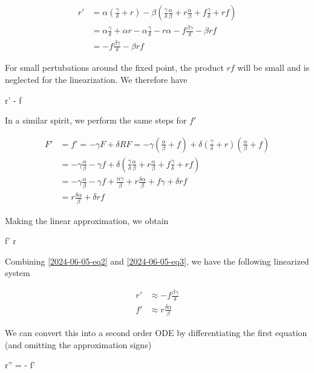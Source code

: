 \begin{align*}
    r' &= \alpha \left(\frac{\gamma}{\delta} + r \right)- \beta \left(\frac{\gamma}{\delta} \frac{\alpha}{\beta} + r \frac{\alpha}{\beta} + f \frac{\gamma}{\delta} + rf\right)\\
    &= \alpha \frac{\gamma}{\delta} + \alpha r  - \alpha \frac{\gamma}{\delta}  - r \alpha - f \frac{\beta \gamma}{\delta} - \beta rf \\
    &= - f \frac{\beta \gamma}{\delta} - \beta rf 
\end{align*}

For small pertubations around the fixed point, the product $rf$ will be small and is neglected for the linearization. We therefore have

\be\label{2024-06-05-eq2}
r' \approx - f \frac{\beta \gamma}{\delta}
\ee

In a similar spirit, we perform the same steps for $f'$

\begin{align*}
    F' &= f' = -\gamma F + \delta RF = -\gamma \left( \frac{\alpha}{\beta} + f \right) + \delta \left( \frac{\gamma}{\delta} + r\right) \left( \frac{\alpha}{\beta} + f\right) \\
    &= -\gamma \frac{\alpha}{\beta} - \gamma f + \delta \left( \frac{\gamma}{\delta} \frac{\alpha}{\beta} + r \frac{\alpha}{\beta} + f \frac{\gamma}{\delta} + rf \right) \\
    &= -\gamma \frac{\alpha}{\beta} - \gamma f + \frac{\alpha \gamma}{\beta} + r \frac{\delta \alpha}{\beta} + f \gamma + \delta rf \\
    &=  r \frac{\delta \alpha}{\beta} + \delta rf
\end{align*}

Making the linear approximation, we obtain

\be\label{2024-06-05-eq3}
f' \approx  r \frac{\delta \alpha}{\beta}
\ee

Combining \eqref{2024-06-05-eq2} and \eqref{2024-06-05-eq3}, we have the following linearized system

\begin{align*}
    r' &\approx - f \frac{\beta \gamma}{\delta} \\
    f' &\approx  r \frac{\delta \alpha}{\beta}
\end{align*}

We can convert this into a second order ODE by differentiating the first equation (and omitting the approximation signs)

\bee
    r'' = - \frac{\beta \gamma}{\delta} f'
\eee

